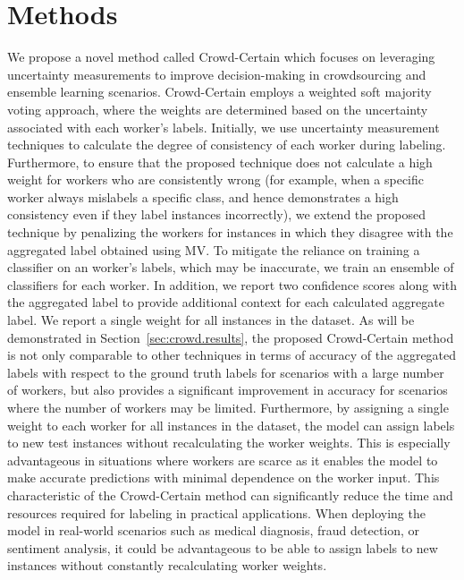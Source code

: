 \documentclass[default]{bst/sn-jnl_mine}%
\begin{document}
\section{Methods}\label{sec:crowd.method}
We propose a novel method called Crowd-Certain which focuses on leveraging uncertainty measurements to improve decision-making in crowdsourcing and ensemble learning scenarios. Crowd-Certain employs a weighted soft majority voting approach, where the weights are determined based on the uncertainty associated with each worker's labels. Initially, we use uncertainty measurement techniques to calculate the degree of consistency of each worker during labeling.
Furthermore, to ensure that the proposed technique does not calculate a high weight for workers who are consistently wrong (for example, when a specific worker always mislabels a specific class, and hence demonstrates a high consistency even if they label instances incorrectly), we extend the proposed technique by penalizing the workers for instances in which they disagree with the aggregated label obtained using MV\@. To mitigate the reliance on training a classifier on an worker's labels, which may be inaccurate, we train an ensemble of classifiers for each worker. In addition, we report two confidence scores along with the aggregated label to provide additional context for each calculated aggregate label. We report a single weight for all instances in the dataset. As will be demonstrated in Section~\ref{sec:crowd.results}, the proposed Crowd-Certain method is not only comparable to other techniques in terms of accuracy of the aggregated labels with respect to the ground truth labels for scenarios with a large number of workers, but also provides a significant improvement in accuracy for scenarios where the number of workers may be limited. Furthermore, by assigning a single weight to each worker for all instances in the dataset, the model can assign labels to new test instances without recalculating the worker weights. This is especially advantageous in situations where workers are scarce as it enables the model to make accurate predictions with minimal dependence on the worker input. This characteristic of the Crowd-Certain method can significantly reduce the time and resources required for labeling in practical applications. When deploying the model in real-world scenarios such as medical diagnosis, fraud detection, or sentiment analysis, it could be advantageous to be able to assign labels to new instances without constantly recalculating worker weights.
\end{document}
